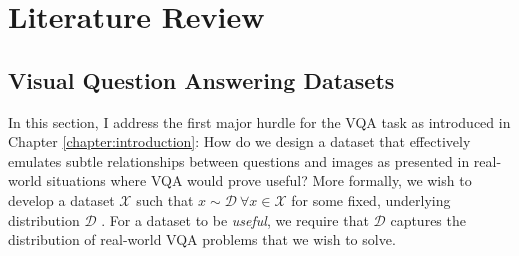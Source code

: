 \chapter{Literature Review}
\label{chapter:literature}



\section{Visual Question Answering Datasets}
\label{section:vqa_datasets}

In this section, I address the first major hurdle for the VQA task as introduced in Chapter \ref{chapter:introduction}: How do we design a dataset that effectively emulates subtle relationships between questions and images as presented in real-world situations where VQA would prove useful? More formally, we wish to develop a dataset \(\mathcal{X}\) such that \(x \sim \mathcal{D}\ \forall x \in \mathcal{X}\) for some fixed, underlying distribution \(\mathcal{D}\) \cite{mohri2018foundations}. For a dataset to be \textit{useful}, we require that \(\mathcal{D}\) captures the distribution of real-world VQA problems that we wish to solve.



